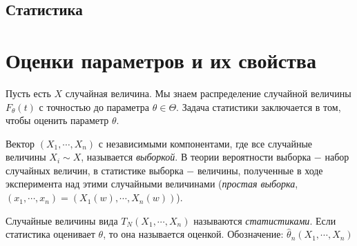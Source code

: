 \clearpage

\begin{center}
\section*{Статистика}
\end{center}
\section{Оценки параметров и их свойства}

Пусть есть $X$ случайная величина. Мы знаем распределение случайной величины $F_{\theta}\left(t\right)$ с точностью до параметра $\theta \in \Theta$. Задача статистики заключается в том, чтобы оценить параметр $\theta$.
\begin{definition}
Вектор $\left(X_1, \cdots, X_n\right)$ с независимыми компонентами, где все случайные величины $X_i \sim X$, называется \textit{выборкой}. В теории вероятности выборка $-$ набор случайных величин, в статистике выборка $-$ величины, полученные в ходе эксперимента над этими случайными величинами (\textit{простая выборка}, $\left(x_1, \cdots, x_n\right) = \left(X_1\left(w\right), \cdots, X_n\left(w\right)\right)$).
\end{definition}

\begin{definition}
Случайные величины вида $T_N\left(X_1, \cdots, X_n\right)$ называются \textit{статистиками}. Если статистика оценивает $\theta$, то она называется оценкой. Обозначение: $\widehat{\theta}_n\left(X_1, \cdots, X_n\right)$ 
\end{definition}

